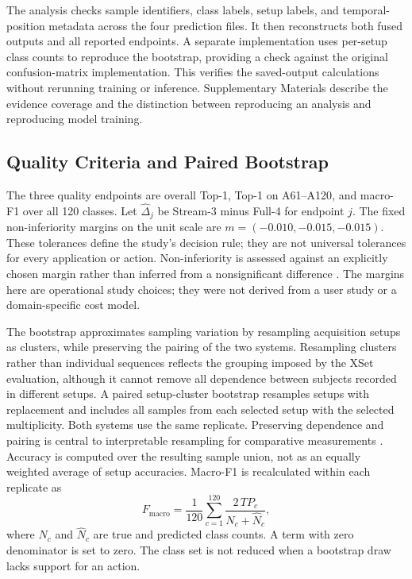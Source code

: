 \documentclass[ai,article,submit,moreauthors]{Definitions/mdpi}
\begin{document}
The analysis checks sample identifiers, class labels, setup labels, and temporal-position metadata across the four prediction files. It then reconstructs both fused outputs and all reported endpoints. A separate implementation uses per-setup class counts to reproduce the bootstrap, providing a check against the original confusion-matrix implementation. This verifies the saved-output calculations without rerunning training or inference. Supplementary Materials describe the evidence coverage and the distinction between reproducing an analysis and reproducing model training.

\subsection{Quality Criteria and Paired Bootstrap}

The three quality endpoints are overall Top-1, Top-1 on A61--A120, and
macro-F1 over all 120 classes. Let $\widehat\Delta_j$ be Stream-3 minus
Full-4 for endpoint $j$. The fixed non-inferiority margins on the unit scale
are $m=(-0.010,-0.015,-0.015)$. These tolerances define the study's decision
rule; they are not universal tolerances for every application or action. Non-inferiority is assessed against an explicitly chosen margin rather than inferred from a nonsignificant difference \cite{walker2011noninferiority}. The margins here are operational study choices; they were not derived from a user study or a domain-specific cost model.

The bootstrap \cite{efron1979bootstrap} approximates sampling variation by resampling acquisition setups as clusters, while preserving the pairing of the two systems. Resampling clusters rather than individual sequences reflects the grouping imposed by the XSet evaluation, although it cannot remove all dependence between subjects recorded in different setups. A paired setup-cluster bootstrap resamples setups with replacement and
includes all samples from each selected setup with the selected multiplicity.
Both systems use the same replicate. Preserving dependence and pairing is central to interpretable resampling for comparative measurements \cite{bakshy2013dependentbootstrap}. Accuracy is computed over the resulting
sample union, not as an equally weighted average of setup accuracies.
Macro-F1 is recalculated within each replicate as
\begin{equation}
 F_{\mathrm{macro}}=\frac{1}{120}\sum_{c=1}^{120}
 \frac{2\,TP_c}{N_c+\widehat N_c},
\end{equation}
where $N_c$ and $\widehat N_c$ are true and predicted class counts. A term
with zero denominator is set to zero. The class set is not reduced when a
bootstrap draw lacks support for an action.
\end{document}
